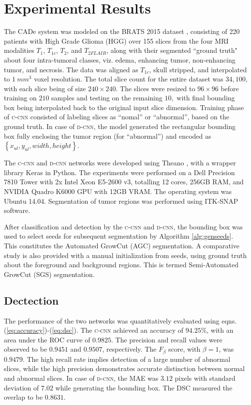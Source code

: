 \documentclass[journal,twocolumn]{IEEEtran}
\begin{document}
\section{Experimental Results}
\label{sec:setup}
The CADe system was modeled on the  BRATS 2015 dataset \cite{BRATS2015}, consisting  of 220  patients with  High Grade Glioma (HGG) over 155 slices from the four  MRI modalities $T_1$, $T_{1c}$, $T_2$, and $T_{2FLAIR}$,  along with their segmented ``ground truth"  about four intra-tumoral classes,  viz. edema, enhancing tumor, non-enhancing tumor, and necrosis. The data was aligned as $T_{1c}$, skull stripped, and interpolated to $1~mm^3$ voxel resolution. The total slice count for the entire dataset was $34,100$, with  each  slice being of size $240 \times 240$. The slices were resized to $96 \times 96$ before  training on  $210$ samples and testing on the remaining $10,$  with  final bounding box  being interpolated back  to  the original input slice  dimension.  Training  phase of  {\scshape{c-cnn}}  consisted of labeling  slices as ``nomal'' or ``abnormal'',  based on the ground truth. In case of {\scshape{d-cnn}},  the model  generated  the rectangular bounding box  fully enclosing  the  tumor region (for ``abnormal'') and  encoded as   $\left\lbrace x_{ul}, y_{ul}, width, height\right\rbrace$.

The {\scshape{c-cnn}} and {\scshape{d-cnn}}  networks were developed using Theano \cite{Bergstra2010_theano}, with a wrapper library Keras \cite{Chollet2015} in Python. The experiments were performed on a Dell Precision 7810 Tower with 2x Intel Xeon E5-2600 v3, totalling 12 cores, 256GB RAM, and NVIDIA Quadro K6000 GPU with 12GB VRAM. The operating system was Ubuntu 14.04. Segmentation of tumor regions was performed using ITK-SNAP \cite{itksnap} software.


After classification and detection by the {\scshape{c-cnn}} and {\scshape{d-cnn}}, the bounding box was  used to select seeds for
subsequent segmentation by  Algorithm \ref{alg:genseeds}. This constitutes the Automated GrowCut (AGC) segmentation. A comparative study is also provided with a manual  initialization  from seeds, using ground truth about  the foreground and background regions.  This is termed Semi-Automated GrowCut (SGS) segmentation.


\subsection{Dectection}
The performance of the two networks was quantitatively evaluated using eqns. (\ref{eq:accuracy})-(\ref{eq:dsc}). The  {\scshape{c-cnn}}  achieved an accuracy of $94.25\%$, with an area under the ROC curve of $0.9825$. The precision and recall values  were observed to be $0.9451$ and $0.9507$, respectively. The $F_\beta$ score, with $\beta = 1$, was $0.9479$. The  high recall rate implies detection of a large number of abnormal slices, while the high precision demonstrates accurate distinction  between normal and abnormal slices. In case  of {\scshape{d-cnn}}, the MAE was  $3.12$ pixels with standard deviation of  $7.02$ while generating the  bounding box. The DSC measured the overlap to be $0.8631$.
\end{document}
